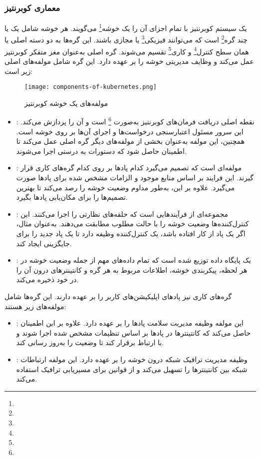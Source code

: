 \subsubsection{معماری کوبرنتیز}
یک سیستم کوبرنتیز با تمام اجزای آن را یک خوشه\footnote{} می‌گویند. هر خوشه شامل یک یا چند گره\footnote{} است که می‌توانند فیزیکی\footnote{} یا مجازی باشند. این گره‌ها به دو دسته اصلی یا همان سطح کنترل\footnote{} و کاری\footnote{} تقسیم می‌شوند.
گره اصلی به‌عنوان مغز متفکر کوبرنتیز عمل می‌کند و وظایف مدیریتی خوشه را بر عهده دارد. این گره شامل مولفه‌های اصلی زیر است:

\begin{figure}[t]
	\centering
	\texttt{[image: components-of-kubernetes.png]}
	\caption{مولفه‌های یک خوشه کوبرنتیز}
	\label{fig: components of kuber}
\end{figure}

\begin{itemize}
	\item 
	: 
	نقطه اصلی دریافت فرمان‌های کوبرنتیز به‌صورت \footnote{} است و آن را پردازش می‌کند. این سرور مسئول اعتبارسنجی درخواست‌ها و اجرای آن‌ها بر روی خوشه است. همچنین، این مولفه به‌عنوان بخشی از مولفه‌های دیگر گره اصلی عمل می‌کند تا اطمینان حاصل شود که دستورات به درستی اجرا می‌شوند.
	\item 
	: 
	مولفه‌ای است که تصمیم می‌گیرد کدام پادها بر روی کدام گره‌های کاری قرار گیرند. این فرایند بر اساس منابع موجود و الزامات مشخص شده برای پادها صورت می‌گیرد. علاوه بر این، به‌طور مداوم وضعیت خوشه را رصد می‌کند تا بهترین تصمیم‌ها را برای مکان‌یابی پادها بگیرد.
	\item 
	:
	مجموعه‌ای از فرآیندهایی است که حلقه‌های نظارتی را اجرا می‌کنند. این کنترل‌کننده‌ها وضعیت خوشه را با حالت مطلوب مطابقت می‌دهند. به‌عنوان مثال، اگر یک پاد از کار افتاده باشد، یک کنترل‌کننده وظیفه دارد تا یک پاد جدید را برای جایگزینی ایجاد کند.
	\item 
	: 
	یک پایگاه داده توزیع شده است که تمام داده‌های مهم از جمله وضعیت خوشه در هر لحظه، پیکربندی خوشه، اطلاعات مربوط به هر گره و کانتینترهای درون آن را در خود ذخیره می‌کند. 
\end{itemize}

گره‌های کاری نیز پادهای اپلیکیشن‌های کاربر را بر عهده دارند. این گره‌ها شامل مولفه‌های زیر هستند:
\begin{itemize}
	\item 
	:
	این مولفه وظیفه مدیریت سلامت پادها را بر عهده دارد. علاوه بر این اطمینان حاصل می‌کند که کانتینترها در پادها بر اساس تنظیمات مشخص شده اجرا شوند و با  ارتباط برقرار کند تا وضعیت را به‌روز رسانی کند.
	\item
	: 
	وظیفه مدیریت ترافیک شبکه درون خوشه را بر عهده دارد. این مولفه ارتباطات شبکه بین کانتینترها را تسهیل می‌کند و از قوانین  برای مسیریابی ترافیک استفاده می‌کند.
\end{itemize}

